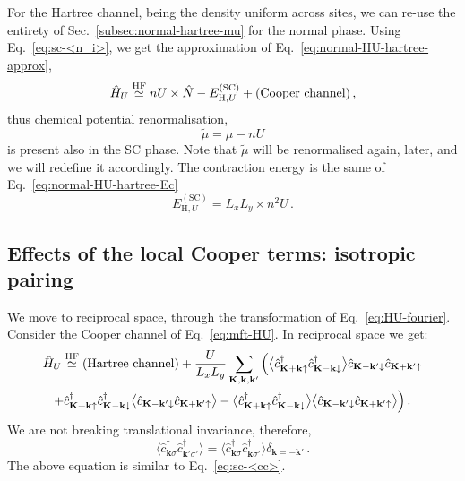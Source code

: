 For the Hartree channel, being the density uniform across sites, we can re-use the entirety of Sec.~\ref{subsec:normal-hartree-mu} for the normal phase. Using Eq.~\eqref{eq:sc-<n_i>}, we get the approximation of Eq.~\eqref{eq:normal-HU-hartree-approx},
\begin{equation}\label{eq:sc-HU-hartree-approx}
	\hat H_U \stackrel{\mathrm{HF}}{\simeq} nU \times \hat N - E_{\mathrm{H},U}^{(\mathrm{SC})} + \text{(Cooper channel)} \, ,
\end{equation}
thus chemical potential renormalisation,
\begin{equation}\label{appeq:sc-mu-shift-int}
	\tilde{\mu} = \mu - nU
\end{equation}
is present also in the SC phase. Note that $\tilde{\mu}$ will be renormalised again, later, and we will redefine it accordingly. The contraction energy is the same of Eq.~\eqref{eq:normal-HU-hartree-Ec}
\begin{equation}\label{eq:sc-HU-hartree-Ec}
	E_{\mathrm{H},U}^{(\mathrm{SC})} = L_x L_y \times n^2 U \, .
\end{equation}


\subsection{Effects of the local Cooper terms: isotropic pairing}

We move to reciprocal space, through the transformation of Eq.~\eqref{eq:HU-fourier}. Consider the Cooper channel of Eq.~\eqref{eq:mft-HU}. In reciprocal space we get:
\begin{multline}
	\hat H_U \stackrel{\mathrm{HF}}{\simeq} \text{(Hartree channel)} + \frac{U}{L_x L_y}
	\sum_{\mathbf{K}, \mathbf{k}, \mathbf{k}'} \Big(
	\big\langle
	\hat c_{\mathbf{K}+\mathbf{k} \uparrow}^\dagger \hat c_{\mathbf{K}-\mathbf{k} \downarrow}^\dagger
	\big\rangle \hat c_{\mathbf{K}-\mathbf{k}' \downarrow} \hat c_{\mathbf{K}+\mathbf{k}' \uparrow} \\
	+ \hat c_{\mathbf{K}+\mathbf{k} \uparrow}^\dagger \hat c_{\mathbf{K}-\mathbf{k} \downarrow}^\dagger \big\langle
	\hat c_{\mathbf{K}-\mathbf{k}' \downarrow} \hat c_{\mathbf{K}+\mathbf{k}' \uparrow} 
	\big\rangle - \big\langle
	\hat c_{\mathbf{K}+\mathbf{k} \uparrow}^\dagger \hat c_{\mathbf{K}-\mathbf{k} \downarrow}^\dagger
	\big\rangle \big\langle 
	\hat c_{\mathbf{K}-\mathbf{k}' \downarrow} \hat c_{\mathbf{K}+\mathbf{k}' \uparrow}
	\big\rangle
	\Big) \, . \label{eq:sc-mft-HU}
\end{multline}
We are not breaking translational invariance, therefore,
\begin{equation}\label{eq:sc-<cc>=delta}
	\big\langle \hat c_{\mathbf{k}\sigma}^\dagger \hat c_{\mathbf{k}'\sigma'}^\dagger \big\rangle = \big\langle \hat c_{\mathbf{k}\sigma}^\dagger \hat c_{\mathbf{k}\sigma'}^\dagger \big\rangle \delta_{\mathbf{k}=-\mathbf{k}'} \, .
\end{equation}
The above equation is similar to Eq.~\eqref{eq:sc-<cc>}.

